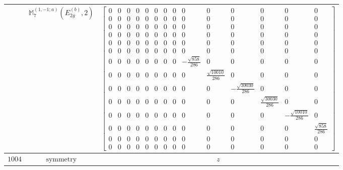 \documentclass[fleqn,8pt,landscape]{jsarticle}
\begin{document}
\begin{longtable}{ccc}
$  $ & $ \mathbb{M}_{7}^{(1,-1;a)}(E_{2g}^{(b)},2) $ & $ \begin{bmatrix} 0 & 0 & 0 & 0 & 0 & 0 & 0 & 0 & 0 & 0 & 0 & 0 & 0 & 0 \\ 0 & 0 & 0 & 0 & 0 & 0 & 0 & 0 & 0 & 0 & 0 & 0 & 0 & 0 \\ 0 & 0 & 0 & 0 & 0 & 0 & 0 & 0 & 0 & 0 & 0 & 0 & 0 & 0 \\ 0 & 0 & 0 & 0 & 0 & 0 & 0 & 0 & 0 & 0 & 0 & 0 & 0 & 0 \\ 0 & 0 & 0 & 0 & 0 & 0 & 0 & 0 & 0 & 0 & 0 & 0 & 0 & 0 \\ 0 & 0 & 0 & 0 & 0 & 0 & 0 & 0 & 0 & 0 & 0 & 0 & 0 & 0 \\ 0 & 0 & 0 & 0 & 0 & 0 & 0 & 0 & - \frac{\sqrt{858}}{286} & 0 & 0 & 0 & 0 & 0 \\ 0 & 0 & 0 & 0 & 0 & 0 & 0 & 0 & 0 & \frac{\sqrt{10010}}{286} & 0 & 0 & 0 & 0 \\ 0 & 0 & 0 & 0 & 0 & 0 & 0 & 0 & 0 & 0 & - \frac{\sqrt{30030}}{286} & 0 & 0 & 0 \\ 0 & 0 & 0 & 0 & 0 & 0 & 0 & 0 & 0 & 0 & 0 & \frac{\sqrt{30030}}{286} & 0 & 0 \\ 0 & 0 & 0 & 0 & 0 & 0 & 0 & 0 & 0 & 0 & 0 & 0 & - \frac{\sqrt{10010}}{286} & 0 \\ 0 & 0 & 0 & 0 & 0 & 0 & 0 & 0 & 0 & 0 & 0 & 0 & 0 & \frac{\sqrt{858}}{286} \\ 0 & 0 & 0 & 0 & 0 & 0 & 0 & 0 & 0 & 0 & 0 & 0 & 0 & 0 \\ 0 & 0 & 0 & 0 & 0 & 0 & 0 & 0 & 0 & 0 & 0 & 0 & 0 & 0 \end{bmatrix} $ \\ \hline
$ 1004 $ & $ \text{symmetry} $ & $ z $ \\

\end{longtable}
\end{document}

